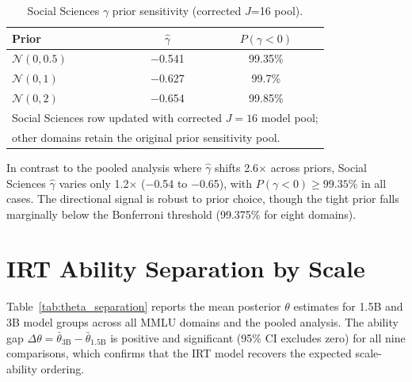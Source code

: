 \begin{table}[h]
\centering
\caption{Social Sciences $\gamma$ prior sensitivity (corrected $J$=16 pool).}
\label{tab:socsci_prior}
\footnotesize
\begin{tabular}{lcc}
\toprule
Prior & $\hat{\gamma}$ & $P(\gamma\!<\!0)$ \\
\midrule
$\mathcal{N}(0, 0.5)$ & $-$0.541 & 99.35\% \\
$\mathcal{N}(0, 1)$ & $-$0.627 & 99.7\% \\
$\mathcal{N}(0, 2)$ & $-$0.654 & 99.85\% \\
\bottomrule
\multicolumn{3}{l}{\scriptsize Social Sciences row updated with corrected $J\!=\!16$ model pool;} \\
\multicolumn{3}{l}{\scriptsize other domains retain the original prior sensitivity pool.}
\end{tabular}
\end{table}

In contrast to the pooled analysis where $\hat{\gamma}$ shifts 2.6$\times$ across priors, Social Sciences $\hat{\gamma}$ varies only 1.2$\times$ ($-$0.54 to $-$0.65), with $P(\gamma<0) \geq 99.35\%$ in all cases. The directional signal is robust to prior choice, though the tight prior falls marginally below the Bonferroni threshold (99.375\% for eight domains).

\section{IRT Ability Separation by Scale}
\label{sec:theta_separation}

Table~\ref{tab:theta_separation} reports the mean posterior $\theta$ estimates for 1.5B and 3B model groups across all MMLU domains and the pooled analysis. The ability gap $\Delta\theta = \bar{\theta}_{3\text{B}} - \bar{\theta}_{1.5\text{B}}$ is positive and significant (95\% CI excludes zero) for all nine comparisons, which confirms that the IRT model recovers the expected scale-ability ordering.

